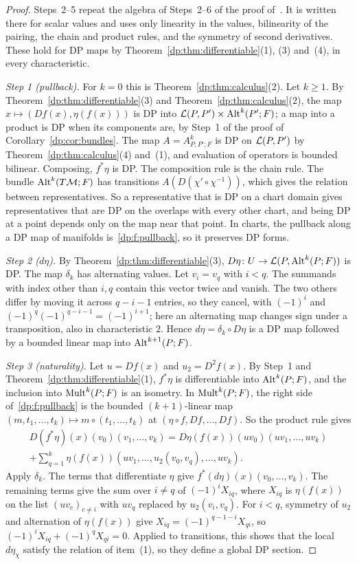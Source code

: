 \begin{proof}
Steps~2--5 repeat the algebra of Steps~2--6 of the proof of~\cite[Theorem~10.7]{I}. It is written there for scalar values and uses only linearity in the values, bilinearity of the pairing, the chain and product rules, and the symmetry of second derivatives. These hold for DP maps by Theorem~\ref{dp:thm:differentiable}(1), (3) and~(4), in every characteristic.

\emph{Step 1 (pullback).} For $k=0$ this is Theorem~\ref{dp:thm:calculus}(2). Let $k\ge1$. By Theorem~\ref{dp:thm:differentiable}(3) and Theorem~\ref{dp:thm:calculus}(2), the map $x\mapsto(Df(x),\eta(f(x)))$ is DP into $\mathcal L(P,P')\times\operatorname{Alt}^k(P';F)$; a map into a product is DP when its components are, by Step~1 of the proof of Corollary~\ref{dp:cor:bundles}. The map $A=A^k_{P,P';F}$ is DP on $\mathcal L(P,P')$ by Theorem~\ref{dp:thm:calculus}(4) and~(1), and evaluation of operators is bounded bilinear. Composing, $f^*\eta$ is DP. The composition rule is the chain rule. The bundle $\operatorname{Alt}^k(T\mathcal M;F)$ has transitions $A(D(\chi'\circ\chi^{-1}))$, which gives the relation between representatives. So a representative that is DP on a chart domain gives representatives that are DP on the overlaps with every other chart, and being DP at a point depends only on the map near that point. In charts, the pullback along a DP map of manifolds is~\eqref{dp:f:pullback}, so it preserves DP forms.

\emph{Step 2 ($d\eta$).} By Theorem~\ref{dp:thm:differentiable}(3), $D\eta\colon U\to\mathcal L(P,\operatorname{Alt}^k(P;F))$ is DP. The map $\delta_k$ has alternating values. Let $v_i=v_q$ with $i<q$. The summands with index other than $i,q$ contain this vector twice and vanish. The two others differ by moving it across $q-i-1$ entries, so they cancel, with $(-1)^i$ and $(-1)^q(-1)^{q-i-1}=(-1)^{i+1}$; here an alternating map changes sign under a transposition, also in characteristic $2$. Hence $d\eta=\delta_k\circ D\eta$ is a DP map followed by a bounded linear map into $\operatorname{Alt}^{k+1}(P;F)$.

\emph{Step 3 (naturality).} Let $u=Df(x)$ and $u_2=D^2f(x)$. By Step~1 and Theorem~\ref{dp:thm:differentiable}(1), $f^*\eta$ is differentiable into $\operatorname{Alt}^k(P;F)$, and the inclusion into $\operatorname{Mult}^k(P;F)$ is an isometry. In $\operatorname{Mult}^k(P;F)$, the right side of~\eqref{dp:f:pullback} is the bounded $(k+1)$\nobreakdash-linear map $(m,t_1,\dots,t_k)\mapsto m\circ(t_1,\dots,t_k)$ at $(\eta\circ f,Df,\dots,Df)$. So the product rule gives
\begin{multline*}
 D(f^*\eta)(x)(v_0)(v_1,\dots,v_k)=D\eta(f(x))(uv_0)(uv_1,\dots,uv_k)\\
 +\sum_{q=1}^k\eta(f(x))(uv_1,\dots,u_2(v_0,v_q),\dots,uv_k).
\end{multline*}
Apply $\delta_k$. The terms that differentiate $\eta$ give $f^*(d\eta)(x)(v_0,\dots,v_k)$. The remaining terms give the sum over $i\ne q$ of $(-1)^iX_{iq}$, where $X_{iq}$ is $\eta(f(x))$ on the list $(uv_c)_{c\ne i}$ with $uv_q$ replaced by $u_2(v_i,v_q)$. For $i<q$, symmetry of $u_2$ and alternation of $\eta(f(x))$ give $X_{iq}=(-1)^{q-1-i}X_{qi}$, so $(-1)^iX_{iq}+(-1)^qX_{qi}=0$. Applied to transitions, this shows that the local $d\eta_\chi$ satisfy the relation of item~(1), so they define a global DP section.


\end{proof}
